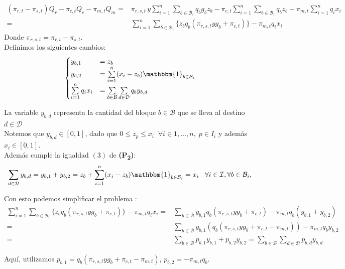 \documentclass[12pt,letterpaper]{article}
\newcommand\mB{\mathcal{B}}
\newcommand\mD{\mathcal{D}}
\newcommand\mI{\mathcal{I}}
\newcommand{\Ind}{\mathbbm{1}}
\begin{document}
\begin{align*}
     (\pi_{r,t} - \pi_{s,t} ) Q_{r}  - \pi_{c,t} Q_{c} - \pi_{m,t} Q_{m} = & \pi_{r,s,t}  \,y \sum\limits_{i = 1}^n \sum\limits_{b \in \mB_i} q_{b} g_{b} z_{b}  - \pi_{c,t} \sum\limits_{i = 1}^n \sum\limits_{b \in \mB_i} q_{b} z_{b} - \pi_{m,t} \sum\limits_{i = 1}^n q_i x_i\\
     = & \sum\limits_{i=1}^n \sum\limits_{b \in \mB_i}\{ z_b q_b(\pi_{r,s,t} y g_b+\pi_{c,t}) \} - \pi_{m,t} q_i x_i
\end{align*}
Donde $\pi_{r,s,t} = \pi_{r,t}-\pi_{s,t}$.\\
Definimos los siguientes cambios:
\begin{align*}
\begin{cases}
y_{b,1} & =z_b\\
y_{b,2} & =\sum \limits_{i=1}^n(x_i -z_b)\Ind_{b\in \mB_i} \\
\sum \limits_{i=1}^n q_i x_i & =\sum\limits_{b\in\mB}\sum \limits_{d \in \mD} q_b y_{b,d} 
\end{cases}
\end{align*}

La variable $y_{b,d}$ representa la cantidad del bloque $b\in\mB$ que se lleva al destino $d\in\mD$\\
Notemos que $y_{b,d}\in [0,1]$, dado que $0\leq z_p \leq x_i \;\; \forall i \in 1,\ldots,n, \; p \in I_i$ y además $x_i \in [0,1]$.\\

Además cumple la igualdad $(3)$ de \textbf{(P\textsubscript{2})}:
$$
 \sum\limits_{d \in \mD} y_{b,d}  
=  y_{b,1} + y_{b,2} 
= z_b + \sum \limits_{i=1}^n(x_i -z_b)\Ind_{b\in \mB_i} 
= x_i \;\;\; \forall i \in \mI, \forall b \in \mB_i,\\
$$

Con esto podemos simplificar el problema :
\begin{align*}
    \sum\limits_{i=1}^n \sum\limits_{b \in \mB_i}\{ z_b q_b(\pi_{r,s,t} y g_b+\pi_{c,t}) \} - \pi_{m,t} q_i x_i = & \sum\limits_{b \in \mB}  y_{b,1} q_b(\pi_{r,s,t} y g_b+\pi_{c,t})  - \pi_{m,t} q_b (y_{b,1}+y_{b,2})\\
= &\sum\limits_{b \in \mB}  y_{b,1} (q_b(\pi_{r,s,t} y g_b+\pi_{c,t}-\pi_{m,t}))  - \pi_{m,t} q_b y_{b,2}\\
= & \sum \limits_{b \in \mB} p_{b,1}y_{b,1} +p_{b,2}y_{b,2} = \sum \limits_{b \in \mB} \sum \limits_{d \in \mD} p_{b,d}y_{b,d}
\end{align*}

Aquí, utilizamos $p_{b,1} = q_b(\pi_{r,s,t} y g_b+\pi_{c,t}-\pi_{m,t})$, $p_{b,2} = - \pi_{m,t} q_b $.\\
\end{document}
